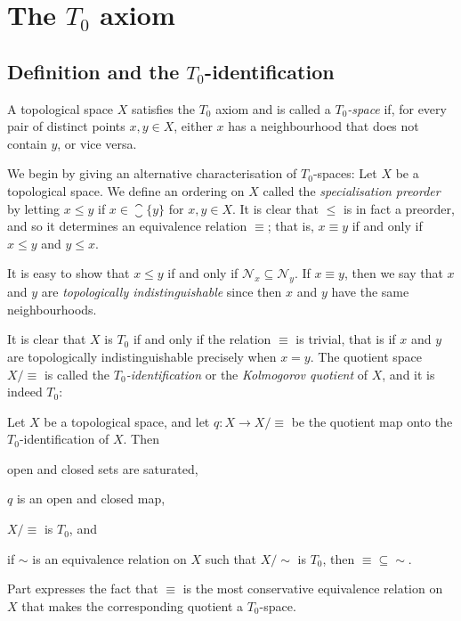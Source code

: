 \documentclass[article, a4paper, 11pt, oneside]{memoir}
\numberwithin{equation}{chapter}
\newcommand{\calN}{\mathcal{N}}
\newcommand{\nhoodfilter}[1]{\calN_{#1}}
\begin{document}
\chapter[The T0 axiom][The $T_0$ axiom]{The $T_0$ axiom}

\section[Definition and the T0-identification][Definition and the $T_0$-identification]{Definition and the $T_0$-identification}

\begin{definition}
    A topological space $X$ satisfies the $T_0$ axiom and is called a \emph{$T_0$-space} if, for every pair of distinct points $x,y \in X$, either $x$ has a neighbourhood that does not contain $y$, or vice versa.
\end{definition}

We begin by giving an alternative characterisation of $T_0$-spaces: Let $X$ be a topological space. We define an ordering on $X$ called the \emph{specialisation preorder} by letting $x \leq y$ if $x \in \closure{\{y\}}$ for $x,y \in X$. It is clear that $\leq$ is in fact a preorder, and so it determines an equivalence relation $\equiv$; that is, $x \equiv y$ if and only if $x \leq y$ and $y \leq x$.

It is easy to show that $x \leq y$ if and only if $\nhoodfilter{x} \subseteq \nhoodfilter{y}$.  If $x \equiv y$, then we say that $x$ and $y$ are \emph{topologically indistinguishable} since then $x$ and $y$ have the same neighbourhoods.

It is clear that $X$ is $T_0$ if and only if the relation $\equiv$ is trivial, that is if $x$ and $y$ are topologically indistinguishable precisely when $x = y$. The quotient space $X/{\equiv}$ is called the \emph{$T_0$-identification} or the \emph{Kolmogorov quotient} of $X$, and it is indeed $T_0$:

\begin{theorem}
    Let $X$ be a topological space, and let $q \colon X \to X/{\equiv}$ be the quotient map onto the $T_0$-identification of $X$. Then
    \begin{enumthm}
        \item \label{enum:T0-identification-saturated} open and closed sets are saturated,
        \item $q$ is an open and closed map,
        \item $X/{\equiv}$ is $T_0$, and
        \item \label{enum:T0-identification-is-smallest-equiv} if $\sim$ is an equivalence relation on $X$ such that $X/{\sim}$ is $T_0$, then ${\equiv} \subseteq {\sim}$.\footnotemark
    \end{enumthm}
\end{theorem}
%
Part  expresses the fact that $\equiv$ is the most conservative equivalence relation on $X$ that makes the corresponding quotient a $T_0$-space.
\end{document}

